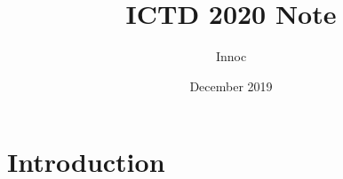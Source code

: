 \documentclass{article}
\title{ICTD 2020 Note}
\author{Innoc}
\date{December 2019}
\begin{document}
\maketitle

\section{Introduction}
\end{document}
